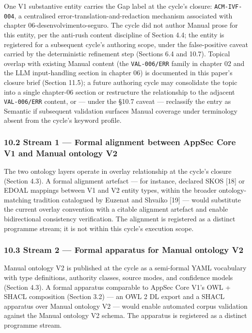 \documentclass[
]{article}
\begin{document}
One V1 substantive entity carries the Gap label at the cycle's closure:
\texttt{ACM-IVF-004}, a centralised error-translation-and-redaction
mechanism associated with chapter 06-desenvolvimento-seguro. The cycle
did not author Manual prose for this entity, per the anti-rush content
discipline of Section 4.4; the entity is registered for a subsequent
cycle's authoring scope, under the false-positive caveat carried by the
deterministic refinement step (Sections 6.4 and 10.7). Topical overlap
with existing Manual content (the \texttt{VAL-006/ERR} family in chapter
02 and the LLM input-handling section in chapter 06) is documented in
this paper's closure brief (Section 11.5); a future authoring cycle may
consolidate the topic into a single chapter-06 section or restructure
the relationship to the adjacent \texttt{VAL-006/ERR} content, or ---
under the §10.7 caveat --- reclassify the entry as Semantic if
subsequent validation surfaces Manual coverage under terminology absent
from the cycle's keyword profile.

\subsubsection{10.2 Stream 1 --- Formal alignment between AppSec Core V1
and Manual ontology
V2}\label{stream-1-formal-alignment-between-appsec-core-v1-and-manual-ontology-v2}

The two ontology layers operate in overlay relationship at the cycle's
closure (Section 4.3). A formal alignment artefact --- for instance,
declared SKOS {[}18{]} or EDOAL mappings between V1 and V2 entity types,
within the broader ontology-matching tradition catalogued by Euzenat and
Shvaiko {[}19{]} --- would substitute the current overlay convention
with a citable alignment artefact and enable bidirectional consistency
verification. The alignment is registered as a distinct programme
stream; it is not within this cycle's execution scope.

\subsubsection{10.3 Stream 2 --- Formal apparatus for Manual ontology
V2}\label{stream-2-formal-apparatus-for-manual-ontology-v2}

Manual ontology V2 is published at the cycle as a semi-formal YAML
vocabulary with type definitions, authority classes, source modes, and
confidence models (Section 4.3). A formal apparatus comparable to AppSec
Core V1's OWL + SHACL composition (Section 3.2) --- an OWL 2 DL export
and a SHACL apparatus over Manual ontology V2 --- would enable automated
corpus validation against the Manual ontology V2 schema. The apparatus
is registered as a distinct programme stream.
\end{document}
